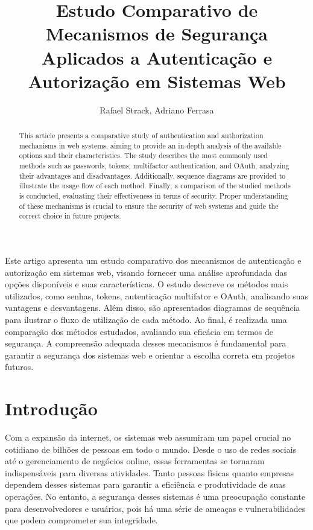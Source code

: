 \documentclass[12pt]{article}
\title{Estudo Comparativo de Mecanismos de Segurança Aplicados a Autenticação e Autorização em Sistemas Web}
\author{Rafael Strack\inst{1}, Adriano Ferrasa\inst{1}}
\begin{document}
\maketitle

\begin{abstract}
This article presents a comparative study of authentication and authorization 
mechanisms in web systems, aiming to provide an in-depth analysis of the 
available options and their characteristics. The study describes the most 
commonly used methods such as passwords, tokens, multifactor authentication, 
and OAuth, analyzing their advantages and disadvantages. Additionally, 
sequence diagrams are provided to illustrate the usage flow of each method. 
Finally, a comparison of the studied methods is conducted, evaluating their 
effectiveness in terms of security. Proper understanding of these mechanisms 
is crucial to ensure the security of web systems and guide the correct 
choice in future projects.
\end{abstract}
     
\begin{resumo}
Este artigo apresenta um estudo comparativo dos mecanismos de autenticação 
e autorização em sistemas web, visando fornecer uma análise aprofundada das 
opções disponíveis e suas características. O estudo descreve os métodos mais 
utilizados, como senhas, tokens, autenticação multifator e OAuth, analisando 
suas vantagens e desvantagens. Além disso, são apresentados diagramas de 
sequência para ilustrar o fluxo de utilização de cada método. Ao final, é 
realizada uma comparação dos métodos estudados, avaliando sua eficácia em 
termos de segurança. A compreensão adequada desses mecanismos é fundamental 
para garantir a segurança dos sistemas web e orientar a escolha correta em 
projetos futuros.
\end{resumo}


\section{Introdução}

Com a expansão da internet, os sistemas web assumiram um papel crucial no
cotidiano de bilhões de pessoas em todo o mundo. Desde o uso de redes sociais até
o gerenciamento de negócios online, essas ferramentas se tornaram indispensáveis
para diversas atividades. Tanto pessoas físicas quanto empresas dependem desses
sistemas para garantir a eficiência e produtividade de suas operações. No entanto, a
segurança desses sistemas é uma preocupação constante para desenvolvedores e
usuários, pois há uma série de ameaças e vulnerabilidades que podem comprometer
sua integridade.
\end{document}
